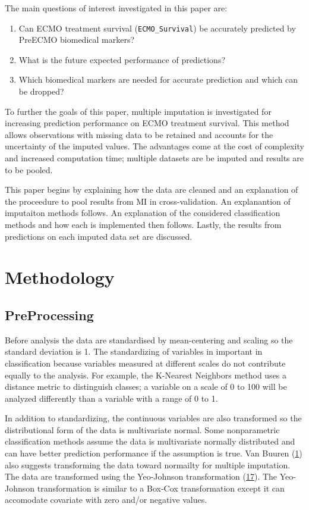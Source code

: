 \documentclass[12pt,]{article}
\providecommand{\tightlist}{%
  \setlength{\itemsep}{0pt}\setlength{\parskip}{0pt}}
\begin{document}
The main questions of interest investigated in this paper are:

\begin{enumerate}
\def\labelenumi{\arabic{enumi}.}
\tightlist
\item
  Can ECMO treatment survival (\texttt{ECMO\_Survival}) be accurately
  predicted by PreECMO biomedical markers?
\item
  What is the future expected performance of predictions?
\item
  Which biomedical markers are needed for accurate prediction and which
  can be dropped?
\end{enumerate}

To further the goals of this paper, multiple imputation is investigated
for increasing prediction performance on ECMO treatment survival. This
method allows observations with missing data to be retained and accounts
for the uncertainty of the imputed values. The advantages come at the
cost of complexity and increased computation time; multiple datasets are
be imputed and results are to be pooled.

This paper begins by explaining how the data are cleaned and an
explanation of the proceedure to pool results from MI in
cross-validation. An explanantion of imputaiton methods follows. An
explanation of the considered classification methods and how each is
implemented then follows. Lastly, the results from predictions on each
imputed data set are discussed.

\newpage

\section{Methodology}\label{methodology}

\subsection{PreProcessing}\label{preprocessing}

Before analysis the data are standardised by mean-centering and scaling
so the standard deviation is 1. The standardizing of variables in
important in classification because variables measured at different
scales do not contribute equally to the analysis. For example, the
K-Nearest Neighbors method uses a distance metric to distinguish
classes; a variable on a scale of 0 to 100 will be analyzed differently
than a variable with a range of 0 to 1.

In addition to standardizing, the continuous variables are also
transformed so the distributional form of the data is multivariate
normal. Some nonparametric classification methods assume the data is
multivariate normally distributed and can have better prediction
performance if the assumption is true. Van Buuren
(\protect\hyperlink{ref-van_buuren_flexible_2012}{1}) also suggests
transforming the data toward normailty for multiple imputation. The data
are transformed using the Yeo-Johnson transformation
(\protect\hyperlink{ref-yeo_new_2000}{17}). The Yeo-Johnson
transformation is similar to a Box-Cox transformation except it can
accomodate covariate with zero and/or negative values.
\end{document}
